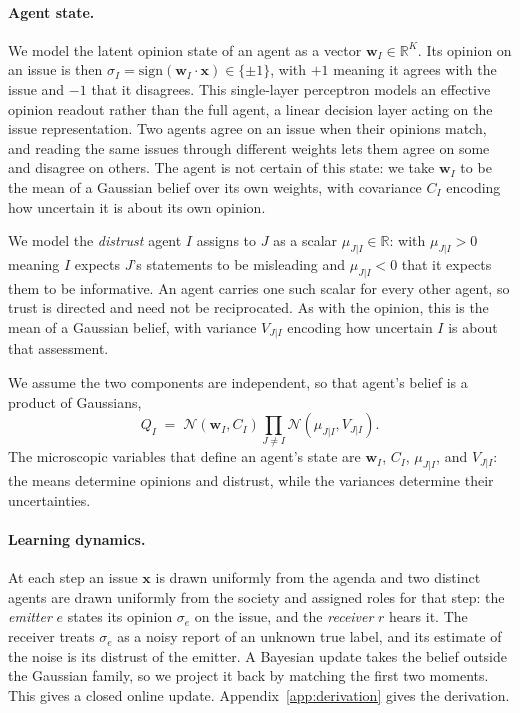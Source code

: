 \documentclass{article}
\begin{document}
\paragraph{Agent state.} We model the latent opinion state of an agent as a vector
$\mathbf{w}_I\in\mathbb{R}^{K}$. Its opinion on an issue is then
$\sigma_I = \mathrm{sign}(\mathbf{w}_I\cdot\mathbf{x})\in\{\pm 1\}$, with $+1$ meaning
it agrees with the issue and $-1$ that it disagrees. This single-layer perceptron
models an effective opinion readout rather than the full agent, a linear decision
layer acting on the issue representation. Two agents agree on an issue when their
opinions match, and reading the same issues through different weights lets them
agree on some and disagree on others. The agent is not certain of this
state: we take $\mathbf{w}_I$ to be the mean of a Gaussian belief over its own
weights, with covariance $C_I$ encoding how uncertain it is about its own opinion.

We model the
\emph{distrust} agent $I$ assigns to $J$ as a scalar $\mu_{J|I}\in\mathbb{R}$:
with $\mu_{J|I}>0$ meaning $I$ expects $J$'s statements to be misleading
and $\mu_{J|I}<0$ that it expects them to be informative. An agent carries one
such scalar for every other agent, so trust is directed and need not be
reciprocated. As with the opinion, this is the mean of a Gaussian belief, with
variance $V_{J|I}$ encoding how uncertain $I$ is about that assessment.

We assume the two components are independent, so that agent's belief is a
product of Gaussians,
%
\begin{equation}
  Q_I \;=\; \mathcal{N}(\mathbf{w}_I, C_I)
  \prod_{J\neq I}\mathcal{N}(\mu_{J|I}, V_{J|I}).
  \label{eq:belief}
\end{equation}
%
The microscopic variables that define an agent's state are $\mathbf{w}_I$, $C_I$,
$\mu_{J|I}$, and $V_{J|I}$: the means determine opinions and distrust, while the
variances determine their uncertainties.

\paragraph{Learning dynamics.} At each step an issue $\mathbf{x}$ is drawn uniformly
from the agenda and two distinct agents are drawn uniformly from the society and
assigned roles for that step: the \emph{emitter} $e$ states its opinion
$\sigma_e$ on the issue, and the \emph{receiver} $r$ hears it.
The receiver treats $\sigma_e$ as a noisy report of
an unknown true label, and its estimate of the noise is its distrust of the
emitter. A Bayesian update takes the belief outside the Gaussian family, so we
project it back by matching the first two moments. This gives a closed online
update. Appendix~\ref{app:derivation} gives the derivation.
\end{document}
